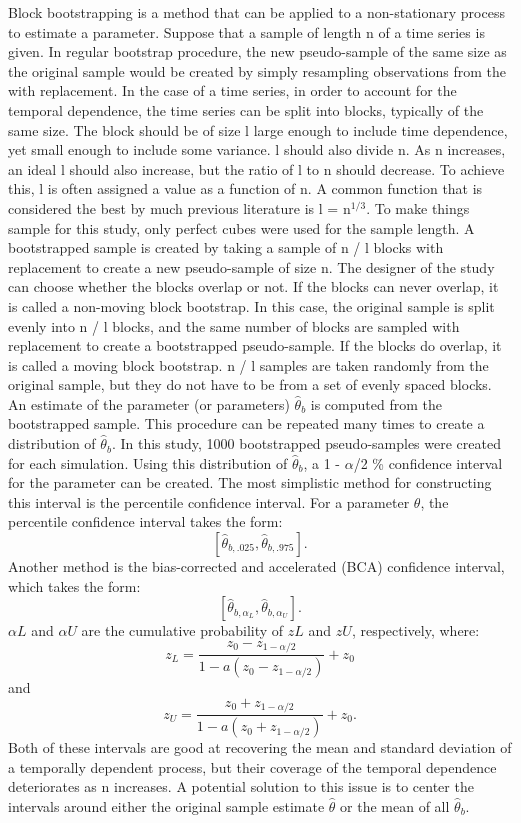 \documentclass[12pt, letterpaper, titlepage]{article}
\begin{document}
Block bootstrapping is a method that can be applied to a non-stationary process to estimate a parameter. Suppose that a sample of length n of a time series is given. In regular bootstrap procedure, the new pseudo-sample of the same size as the original sample would be created by simply resampling observations from the with replacement. In the case of a time series, in order to account for the temporal dependence, the time series can be split into blocks, typically of the same size. The block should be of size l large enough to include time dependence, yet small enough to include some variance. l should also divide n. As n increases, an ideal l should also increase, but the ratio of l to n should decrease. To achieve this, l is often assigned a value as a function of n. A common function that is considered the best by much previous literature is l = n$^{1/3}$. To make things sample for this study, only perfect cubes were used for the sample length. A bootstrapped sample is created by taking a sample of n / l blocks with replacement to create a new pseudo-sample of size n. The designer of the study can choose whether the blocks overlap or not. If the blocks can never overlap, it is called a non-moving block bootstrap. In this case, the original sample is split evenly into n / l blocks, and the same number of blocks are sampled with replacement to create a bootstrapped pseudo-sample. If the blocks do overlap, it is called a moving block bootstrap. n / l samples are taken randomly from the original sample, but they do not have to be from a set of evenly spaced blocks. An estimate of the parameter (or parameters) $\hat{\theta}_{b}$ is computed from the bootstrapped sample. This procedure can be repeated many times to create a distribution of $\hat{\theta}_{b}$. In this study, 1000 bootstrapped pseudo-samples were created for each simulation. Using this distribution of $\hat{\theta}_{b}$, a 1 - $\alpha$/2 \% confidence interval for the parameter can be created. The most simplistic method for constructing this interval is the percentile confidence interval. For a parameter $\theta$, the percentile confidence interval takes the form: \[ [\hat{\theta}_{b, .025}, \hat{\theta}_{b, .975}].\] Another method is the bias-corrected and accelerated 
(BCA) confidence interval, which takes the form: \[ [\hat{\theta}_{b, \alpha_{L}}, \hat{\theta}_{b, \alpha_{U}}].\] $\alpha{L}$ and $\alpha{U}$ are the cumulative probability of $z{L}$ and $z{U}$, respectively, where:
\[z_{L} = \frac{z_{0} - z_{1 - \alpha/2}}{1 - a(z_{0} - z_{1 - \alpha/2})} + z_{0}\] and
\[z_{U} = \frac{z_{0} + z_{1 - \alpha/2}}{1 - a(z_{0} + z_{1 - \alpha/2})} + z_{0}.\] 
	Both of these intervals are good at recovering the mean and standard deviation of a temporally dependent process, but their coverage of the temporal dependence deteriorates as n increases. A potential solution to this issue is to center the intervals around either the original sample estimate $\hat{\theta}$ or the mean of all $\hat{\theta}_{b}$.
\end{document}
